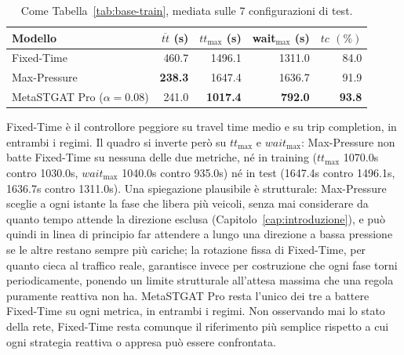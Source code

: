\begin{table}[htbp]
  \centering
  \begin{tabular}{@{}lrrrr@{}}
    \toprule
    Modello                       & $\overline{tt}$ (s) & $tt_{\max}$ (s) & wait$_{\max}$ (s) & $tc$ $(\%)$   \\
    \midrule
    Fixed-Time                    & 460.7               & 1496.1          & 1311.0            & 84.0          \\
    Max-Pressure                  & \textbf{238.3}      & 1647.4          & 1636.7            & 91.9          \\
    MetaSTGAT Pro ($\alpha=0.08$) & 241.0               & \textbf{1017.4} & \textbf{792.0}    & \textbf{93.8} \\
    \bottomrule
  \end{tabular}
  \caption{Come Tabella~\ref{tab:base-train}, mediata sulle 7 configurazioni
    di test.}
  \label{tab:base-test}
\end{table}

Fixed-Time è il controllore peggiore su travel time medio e su trip
completion, in entrambi i regimi. Il quadro si inverte però su
$tt_{\max}$ e $wait_{\max}$: Max-Pressure non batte Fixed-Time su nessuna
delle due metriche, né in training ($tt_{\max}$ 1070.0s contro 1030.0s,
$wait_{\max}$ 1040.0s contro 935.0s) né in test (1647.4s contro 1496.1s,
1636.7s contro 1311.0s). Una spiegazione plausibile è strutturale:
Max-Pressure sceglie a ogni istante la fase che libera più veicoli, senza
mai considerare da quanto tempo attende la direzione esclusa
(Capitolo~\ref{cap:introduzione}), e può quindi in linea di principio far
attendere a lungo una direzione a bassa pressione se le altre restano
sempre più cariche; la rotazione fissa di Fixed-Time, per quanto cieca al
traffico reale, garantisce invece per costruzione che ogni fase torni
periodicamente, ponendo un limite strutturale all'attesa massima che una
regola puramente reattiva non ha. MetaSTGAT Pro resta l'unico dei tre a
battere Fixed-Time su ogni metrica, in entrambi i regimi. Non osservando
mai lo stato della rete, Fixed-Time resta comunque il riferimento più
semplice rispetto a cui ogni strategia reattiva o appresa può essere
confrontata.

